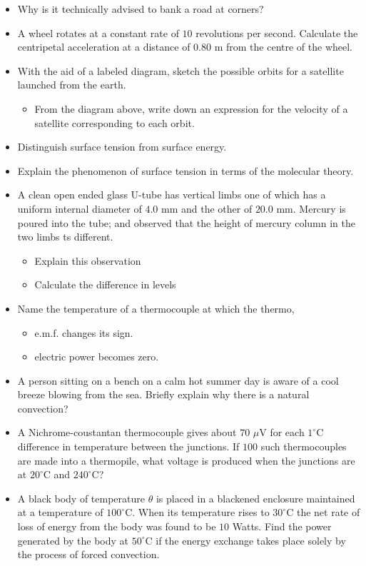 \documentclass{article}
\begin{document}
\begin{itemize}
\item Why is it technically advised to bank a road at corners?
\item A wheel rotates at a constant rate of $ 10$ revolutions per second. Calculate the centripetal acceleration at a distance of $ 0.80$ m from the centre of the wheel.
\item With the aid of a labeled diagram, sketch the possible orbits for a satellite launched from the earth.
 \begin{itemize}
\item From the diagram above, write down an expression for the velocity of a satellite corresponding to each orbit.
\end{itemize}
\item Distinguish surface tension from surface energy.
\item Explain the phenomenon of surface tension in terms of the molecular theory.
\item A clean open ended glass U-tube has vertical limbs one of which has a uniform internal diameter of $ 4.0$ mm and the other of $ 20.0$ mm. Mercury is poured into the tube; and observed that the height of mercury column in the two limbs ts different.
 \begin{itemize}
\item Explain this observation
\item Calculate the difference in levels
\end{itemize}
\item Name the temperature of a thermocouple at which the thermo,
 \begin{itemize}
\item e.m.f. changes its sign.
\item electric power becomes zero.
\end{itemize}
\item A person sitting on a bench on a calm hot summer day is aware of a cool breeze blowing from the sea. Briefly explain why there is a natural convection?
\item A Nichrome-coustantan thermocouple gives about $ 70$ $\mu$V for each $ 1^{\circ}$C difference in temperature between the junctions. If $ 100$ such thermocouples are made into a thermopile, what voltage is produced when the junctions are at $ 20^{\circ}$C and $ 240^{\circ}$C? 
\item A black body of temperature $ \theta $ is placed in a blackened enclosure maintained at a temperature of $ 100^{\circ}$C. When its temperature rises to $ 30^{\circ}$C the net rate of loss of energy from the body was found to be $ 10$ Watts. Find the power generated by the body at $ 50^{\circ}$C if the energy exchange takes place solely by the process of forced convection.

\end{itemize}
\end{document}

